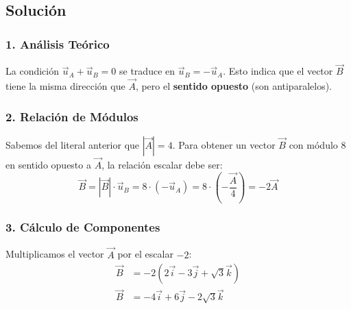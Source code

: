 \documentclass[12pt, a4paper]{article}
\begin{document}
\begin{center}
\end{center}

\subsection*{Solución}

\subsubsection*{1. Análisis Teórico}
La condición $\vec{u}_A + \vec{u}_B = 0$ se traduce en $\vec{u}_B = -\vec{u}_A$. Esto indica que el vector $\vec{B}$ tiene la misma dirección que $\vec{A}$, pero el \textbf{sentido opuesto} (son antiparalelos).

\subsubsection*{2. Relación de Módulos}
Sabemos del literal anterior que $|\vec{A}| = 4$. Para obtener un vector $\vec{B}$ con módulo $8$ en sentido opuesto a $\vec{A}$, la relación escalar debe ser:
\begin{equation*}
    \vec{B} = |\vec{B}| \cdot \vec{u}_B = 8 \cdot (-\vec{u}_A) = 8 \cdot \left( -\frac{\vec{A}}{4} \right) = -2\vec{A}
\end{equation*}

\subsubsection*{3. Cálculo de Componentes}
Multiplicamos el vector $\vec{A}$ por el escalar $-2$:
\begin{align*}
    \vec{B} &= -2(2\vec{i} - 3\vec{j} + \sqrt{3}\vec{k}) \\
    \vec{B} &= -4\vec{i} + 6\vec{j} - 2\sqrt{3}\vec{k}
\end{align*}
\end{document}
